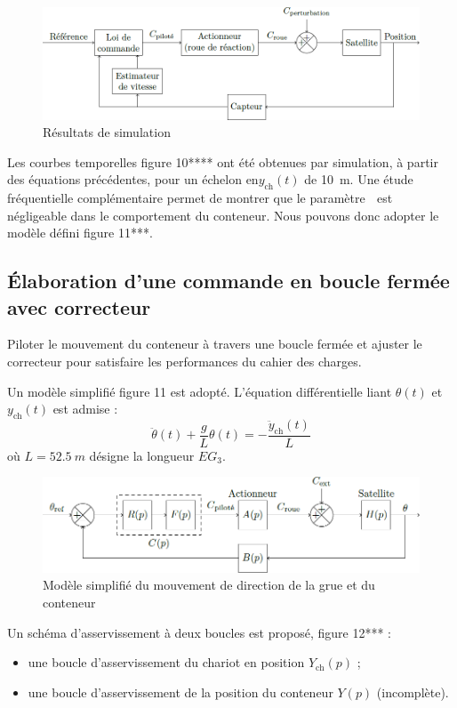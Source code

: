 \documentclass[10pt,fleqn]{article} %
\begin{document}
\begin{figure}[H]
\centering
\includegraphics[width=\linewidth]{images/fig_10}
\caption{Résultats de simulation \label{fig_10}}
\end{figure}


Les courbes temporelles figure 10**** ont été obtenues par simulation, à partir des équations précédentes, pour un
échelon en$y_{\text{ch}}(t)$ de \SI{10}{m}. Une étude fréquentielle complémentaire permet de montrer que le paramètre  est
négligeable dans le comportement du conteneur. Nous pouvons donc adopter le modèle défini figure 11***.


\subsection{Élaboration d’une commande en boucle fermée avec correcteur}

\begin{obj}
Piloter le mouvement du conteneur à travers une boucle fermée et ajuster le correcteur pour
satisfaire les performances du cahier des charges.
\end{obj}

Un modèle simplifié figure 11 est adopté. L’équation différentielle liant $\theta(t)$ et $y_{\text{ch}}(t)$ est admise :
$$
\ddot{\theta}(t)+\dfrac{g}{L}\theta(t) = -\dfrac{\ddot{y}_{\text{ch}}(t)}{L} 
$$
où $L=\SI{52,5}{m}$ désigne la longueur $EG_3$.

\begin{figure}[H]
\centering
\includegraphics[width=\linewidth]{images/fig_11}
\caption{Modèle simplifié du mouvement de direction de la grue et du conteneur \label{fig_11}}
\end{figure}


Un schéma d’asservissement à deux boucles est proposé, figure 12*** :
\begin{itemize}
\item une boucle d’asservissement du chariot en position $Y_{\text{ch}}(p)$ ;
\item une boucle d’asservissement de la position du conteneur $Y (p)$ (incomplète).
\end{itemize}
\end{document}

